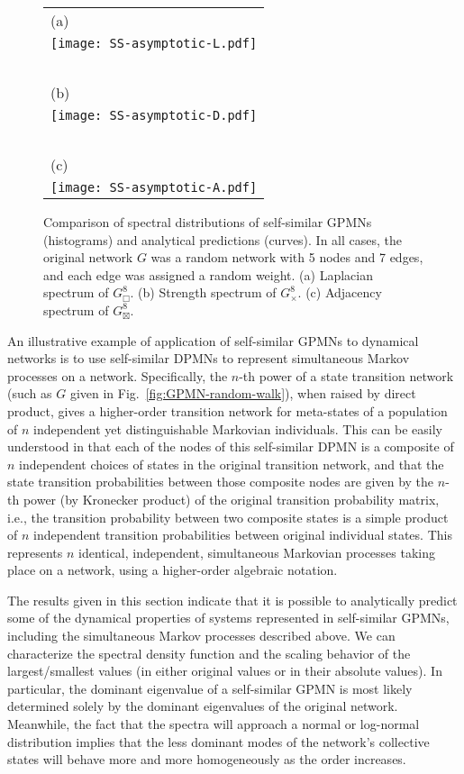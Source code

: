 \documentclass{article}
\DeclareMathOperator*{\CP}{\Box}
\DeclareMathOperator*{\DP}{\times}
\DeclareMathOperator*{\SP}{\boxtimes}
\begin{document}
\begin{figure}
\centering
\begin{tabular}{l}
(a)\\
\texttt{[image: SS-asymptotic-L.pdf]}\\
~\\
(b)\\
\texttt{[image: SS-asymptotic-D.pdf]}\\
~\\
(c)\\
\texttt{[image: SS-asymptotic-A.pdf]}
\end{tabular}
\caption{Comparison of spectral distributions of self-similar GPMNs
  (histograms) and analytical predictions (curves). In all cases, the
  original network $G$ was a random network with 5 nodes and 7 edges,
  and each edge was assigned a random weight. (a) Laplacian spectrum
  of $G^8_{\CP}$. (b) Strength spectrum of $G^8_{\DP}$. (c) Adjacency
  spectrum of $G^8_{\SP}$.}
\label{fig:SS-asymptotic-spectra}
\end{figure}

An illustrative example of application of self-similar GPMNs to
dynamical networks is to use self-similar DPMNs to represent
simultaneous Markov processes on a network. Specifically, the $n$-th
power of a state transition network (such as $G$ given in
Fig.~\ref{fig:GPMN-random-walk}), when raised by direct product, gives
a higher-order transition network for meta-states of a population of
$n$ independent yet distinguishable Markovian individuals. This can be
easily understood in that each of the nodes of this self-similar DPMN
is a composite of $n$ independent choices of states in the original
transition network, and that the state transition probabilities
between those composite nodes are given by the $n$-th power (by
Kronecker product) of the original transition probability matrix,
i.e., the transition probability between two composite states is a
simple product of $n$ independent transition probabilities between
original individual states. This represents $n$ identical,
independent, simultaneous Markovian processes taking place on a
network, using a higher-order algebraic notation.

The results given in this section indicate that it is possible to
analytically predict some of the dynamical properties of systems
represented in self-similar GPMNs, including the simultaneous Markov
processes described above. We can characterize the spectral density
function and the scaling behavior of the largest/smallest values (in
either original values or in their absolute values). In particular,
the dominant eigenvalue of a self-similar GPMN is most likely
determined solely by the dominant eigenvalues of the original
network. Meanwhile, the fact that the spectra will approach a normal
or log-normal distribution implies that the less dominant modes of the
network's collective states will behave more and more homogeneously as
the order increases.
\end{document}
